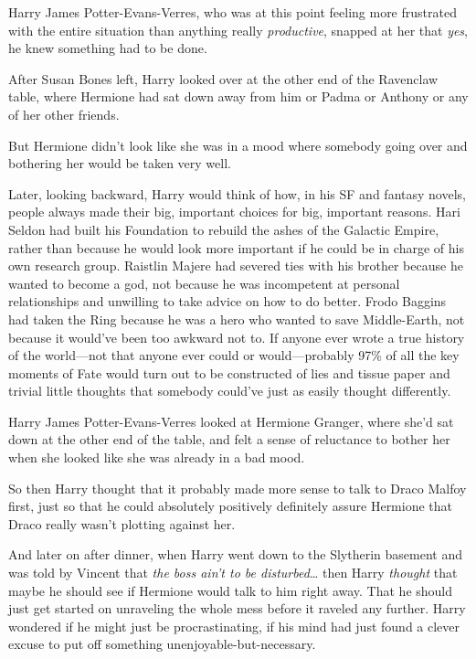 Harry James Potter-Evans-Verres, who was at this point feeling more
frustrated with the entire situation than anything really
\emph{productive}, snapped at her that \emph{yes}, he knew something had
to be done.

After Susan Bones left, Harry looked over at the other end of the
Ravenclaw table, where Hermione had sat down away from him or Padma or
Anthony or any of her other friends.

But Hermione didn't look like she was in a mood where somebody going
over and bothering her would be taken very well.

Later, looking backward, Harry would think of how, in his SF and fantasy
novels, people always made their big, important choices for big,
important reasons. Hari Seldon had built his Foundation to rebuild the
ashes of the Galactic Empire, rather than because he would look more
important if he could be in charge of his own research group. Raistlin
Majere had severed ties with his brother because he wanted to become a
god, not because he was incompetent at personal relationships and
unwilling to take advice on how to do better. Frodo Baggins had taken
the Ring because he was a hero who wanted to save Middle-Earth, not
because it would've been too awkward not to. If anyone ever wrote a true
history of the world---not that anyone ever could or would---probably
97\% of all the key moments of Fate would turn out to be constructed of
lies and tissue paper and trivial little thoughts that somebody could've
just as easily thought differently.

Harry James Potter-Evans-Verres looked at Hermione Granger, where she'd
sat down at the other end of the table, and felt a sense of reluctance
to bother her when she looked like she was already in a bad mood.

So then Harry thought that it probably made more sense to talk to Draco
Malfoy first, just so that he could absolutely positively definitely
assure Hermione that Draco really wasn't plotting against her.

And later on after dinner, when Harry went down to the Slytherin
basement and was told by Vincent that \emph{the boss ain't to be
disturbed}\ldots{} then Harry \emph{thought} that maybe he should see if
Hermione would talk to him right away. That he should just get started
on unraveling the whole mess before it raveled any further. Harry
wondered if he might just be procrastinating, if his mind had just found
a clever excuse to put off something unenjoyable-but-necessary.

